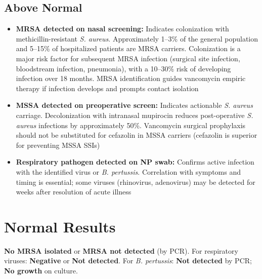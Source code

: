 \subsection*{Above Normal}
\begin{itemize}
  \item \textbf{MRSA detected on nasal screening:} Indicates colonization with methicillin-resistant \textit{S. aureus}. Approximately 1--3\% of the general population and 5--15\% of hospitalized patients are MRSA carriers. Colonization is a major risk factor for subsequent MRSA infection (surgical site infection, bloodstream infection, pneumonia), with a 10--30\% risk of developing infection over 18 months. MRSA identification guides vancomycin empiric therapy if infection develops and prompts contact isolation
  \item \textbf{MSSA detected on preoperative screen:} Indicates actionable \textit{S. aureus} carriage. Decolonization with intranasal mupirocin reduces post-operative \textit{S. aureus} infections by approximately 50\%. Vancomycin surgical prophylaxis should not be substituted for cefazolin in MSSA carriers (cefazolin is superior for preventing MSSA SSIs)
  \item \textbf{Respiratory pathogen detected on NP swab:} Confirms active infection with the identified virus or \textit{B. pertussis}. Correlation with symptoms and timing is essential; some viruses (rhinovirus, adenovirus) may be detected for weeks after resolution of acute illness
\end{itemize}

\section*{Normal Results}
\textbf{No MRSA isolated} or \textbf{MRSA not detected} (by PCR). For respiratory viruses: \textbf{Negative} or \textbf{Not detected}. For \textit{B. pertussis}: \textbf{Not detected} by PCR; \textbf{No growth} on culture.

